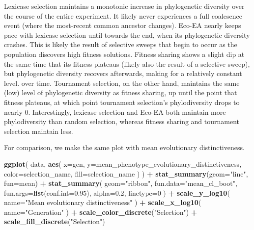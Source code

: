 \documentclass[]{book}
\newenvironment{Shaded}{\begin{snugshade}}{\end{snugshade}}
\newcommand{\DataTypeTok}[1]{\textcolor[rgb]{0.13,0.29,0.53}{#1}}
\newcommand{\DecValTok}[1]{\textcolor[rgb]{0.00,0.00,0.81}{#1}}
\newcommand{\FloatTok}[1]{\textcolor[rgb]{0.00,0.00,0.81}{#1}}
\newcommand{\KeywordTok}[1]{\textcolor[rgb]{0.13,0.29,0.53}{\textbf{#1}}}
\newcommand{\NormalTok}[1]{#1}
\newcommand{\OperatorTok}[1]{\textcolor[rgb]{0.81,0.36,0.00}{\textbf{#1}}}
\newcommand{\StringTok}[1]{\textcolor[rgb]{0.31,0.60,0.02}{#1}}
\begin{document}
Lexicase selection maintains a monotonic increase in phylogenetic diversity over the course of the entire experiment. It likely never experiences a full coalesence event (where the most-recent common ancestor changes). Eco-EA nearly keeps pace with lexicase selection until towards the end, when its phylogenetic diversity crashes. This is likely the result of selective sweeps that begin to occur as the population discovers high fitness solutions. Fitness sharing shows a slight dip at the same time that its fitness plateaus (likely also the result of a selective sweep), but phylogenetic diversity recovers afterwards, making for a relatively constant level. over time. Tournament selection, on the other hand, maintains the same (low) level of phylogenetic diversity as fitness sharing, up until the point that fitness plateaus, at which point tournament selection's phylodiversity drops to nearly 0. Interestingly, lexicase selection and Eco-EA both maintain more phylodiversity than random selection, whereas fitness sharing and tournament selection maintain less.

For comparison, we make the same plot with mean evolutionary distinctiveness.

\begin{Shaded}
\begin{Highlighting}[]
\KeywordTok{ggplot}\NormalTok{(}
\NormalTok{    data,}
    \KeywordTok{aes}\NormalTok{(}
      \DataTypeTok{x=}\NormalTok{gen,}
      \DataTypeTok{y=}\NormalTok{mean_phenotype_evolutionary_distinctiveness,}
      \DataTypeTok{color=}\NormalTok{selection_name,}
      \DataTypeTok{fill=}\NormalTok{selection_name}
\NormalTok{    )}
\NormalTok{  ) }\OperatorTok{+}
\StringTok{  }\KeywordTok{stat_summary}\NormalTok{(}\DataTypeTok{geom=}\StringTok{"line"}\NormalTok{, }\DataTypeTok{fun=}\NormalTok{mean) }\OperatorTok{+}
\StringTok{  }\KeywordTok{stat_summary}\NormalTok{(}
    \DataTypeTok{geom=}\StringTok{"ribbon"}\NormalTok{,}
    \DataTypeTok{fun.data=}\StringTok{"mean_cl_boot"}\NormalTok{,}
    \DataTypeTok{fun.args=}\KeywordTok{list}\NormalTok{(}\DataTypeTok{conf.int=}\FloatTok{0.95}\NormalTok{),}
    \DataTypeTok{alpha=}\FloatTok{0.2}\NormalTok{,}
    \DataTypeTok{linetype=}\DecValTok{0}
\NormalTok{  ) }\OperatorTok{+}
\StringTok{  }\KeywordTok{scale_y_log10}\NormalTok{(}
    \DataTypeTok{name=}\StringTok{"Mean evolutionary distinctiveness"}
\NormalTok{  ) }\OperatorTok{+}
\StringTok{  }\KeywordTok{scale_x_log10}\NormalTok{(}
    \DataTypeTok{name=}\StringTok{"Generation"}
\NormalTok{  ) }\OperatorTok{+}
\StringTok{  }\KeywordTok{scale_color_discrete}\NormalTok{(}\StringTok{"Selection"}\NormalTok{) }\OperatorTok{+}
\StringTok{  }\KeywordTok{scale_fill_discrete}\NormalTok{(}\StringTok{"Selection"}\NormalTok{)}
\end{Highlighting}
\end{Shaded}
\end{document}

